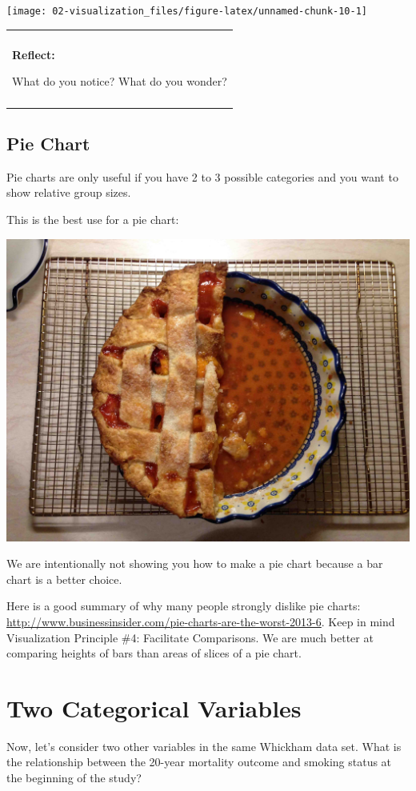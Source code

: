 \documentclass[
]{book}
\newenvironment{reflect}
{
    \begin{center}
    
    \begin{tabular}{|p{0.8\textwidth}|}
    \rowcolor{LightBlue}
    \hline\\
    \rowcolor{LightBlue}
    \textbf{Reflect:}
}
{
    \\\rowcolor{LightBlue}
    \\\hline
    \end{tabular} 
    \end{center}
}
\begin{document}
\begin{center}\texttt{[image: 02-visualization\_files/figure-latex/unnamed-chunk-10-1]} \end{center}

\begin{reflect}
What do you notice? What do you wonder?
\end{reflect}

\hypertarget{pie-chart}{%
\subsection{Pie Chart}\label{pie-chart}}

Pie charts are only useful if you have 2 to 3 possible categories and you want to show relative group sizes.

This is the best use for a pie chart:

\begin{center}\includegraphics[width=.5\textwidth]{Photos/pie} \end{center}

We are intentionally not showing you how to make a pie chart because a bar chart is a better choice.

Here is a good summary of why many people strongly dislike pie charts: \url{http://www.businessinsider.com/pie-charts-are-the-worst-2013-6}. Keep in mind Visualization Principle \#4: Facilitate Comparisons. We are much better at comparing heights of bars than areas of slices of a pie chart.

\hypertarget{two-categorical-variables}{%
\section{Two Categorical Variables}\label{two-categorical-variables}}

Now, let's consider two other variables in the same Whickham data set. What is the relationship between the 20-year mortality outcome and smoking status at the beginning of the study?
\end{document}
